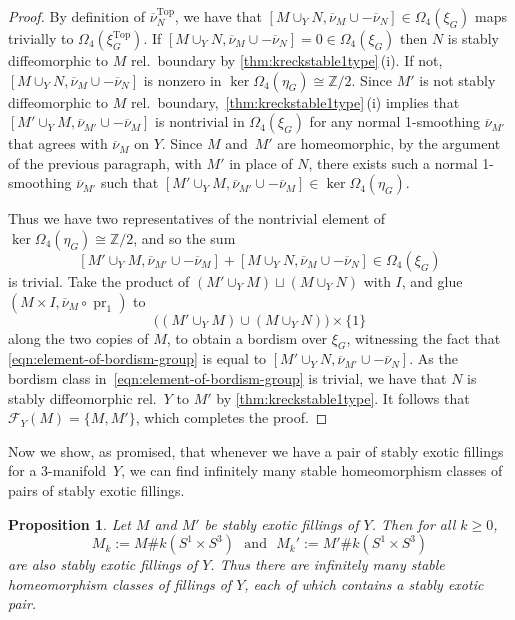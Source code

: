 \documentclass[a4paper, reqno]{amsart}
\newtheorem{proposition}{Proposition}[section]
\theoremstyle{definition}
\theoremstyle{remark}
\renewcommand{\top}{\mathrm{Top}}
\newcommand{\Z}{\mathbb{Z}}
\newcommand{\ol}{\overline}
\DeclareMathOperator{\pr}{pr}
\begin{document}
\begin{proof}
By definition of $\ol{\nu}^{\top}_N$, we have that
$[M \cup_Y N, \ol{\nu}_M \cup - \ol{\nu}_N] \in \Omega_4(\xi_G)$ maps trivially to $\Omega_4(\xi^{\top}_G)$.
If $[M \cup_Y N, \ol{\nu}_M \cup - \ol{\nu}_N] = 0 \in \Omega_4(\xi_G)$ then $N$ is stably diffeomorphic to $M$ rel.\ boundary by \cref{thm:kreckstable1type}\,(i).  If not, $[M \cup_Y N, \ol{\nu}_M \cup - \ol{\nu}_N]$ is nonzero in $\ker \Omega_4(\eta_G) \cong \Z/2$. 
Since $M'$ is not stably diffeomorphic to $M$ rel.\ boundary,~\cref{thm:kreckstable1type}\,(i) implies that $[M' \cup_Y M,\ol{\nu}_{M'} \cup - \ol{\nu}_{M}]$ is nontrivial in $\Omega_4(\xi_G)$ for any normal 1-smoothing $\ol{\nu}_{M'}$ that agrees with $\ol{\nu}_M$ on $Y$. 
Since $M$ and~$M'$ are homeomorphic, by the argument of the previous paragraph, with $M'$ in place of $N$, there exists  such a normal 1-smoothing $\ol{\nu}_{M'}$ such that 
$[M' \cup_Y M,\ol{\nu}_{M'} \cup - \ol{\nu}_{M}]\in \ker \Omega_4(\eta_G)$.

Thus we have two representatives of the nontrivial element of $\ker \Omega_4(\eta_G) \cong \Z/2$, and so  the sum
\begin{equation}\label{eqn:element-of-bordism-group}
    [M' \cup_Y M,\ol{\nu}_{M'} \cup - \ol{\nu}_{M}] + 
[M \cup_Y N, \ol{\nu}_M \cup - \ol{\nu}_N] \in \Omega_4(\xi_G)
\end{equation}
is trivial. 
Take the product of $(M' \cup_Y M) \sqcup (M \cup_Y N)$ with $I$, and glue $(M \times I, \ol{\nu}_M \circ \pr_1)$ to \[\big((M' \cup_Y M) \cup (M \cup_Y N)\big) \times \{1\}\] along the two copies of $M$, to obtain a bordism over $\xi_G$, witnessing the fact that \eqref{eqn:element-of-bordism-group} is equal to $[M' \cup_Y N , \ol{\nu}_{M'} \cup - \ol{\nu}_N]$.  As the bordism class in~\eqref{eqn:element-of-bordism-group} is trivial, we have that $N$ is stably diffeomorphic rel.\ $Y$ to $M'$ by \cref{thm:kreckstable1type}. It follows that $\mathcal{F}_Y(M) = \{M,M'\}$, which completes the proof. 
\end{proof}



Now we show, as promised, that whenever we have a pair of stably exotic fillings for a 3-manifold~$Y$, we can find infinitely many stable homeomorphism classes of pairs of stably exotic fillings. 

\begin{proposition}\label{prop:many}
Let $M$ and $M'$ be stably exotic fillings of $Y$. Then for all $k \geq 0$, 
\[M_k := M \# k(S^1 \times S^3)\,\, \text{ and }\,\, M_k' := M' \# k(S^1 \times S^3)\]
are also stably exotic fillings of $Y$. Thus there are infinitely many stable homeomorphism classes of fillings of $Y$, each of which contains a stably exotic pair. 
\end{proposition} 
\end{document}
